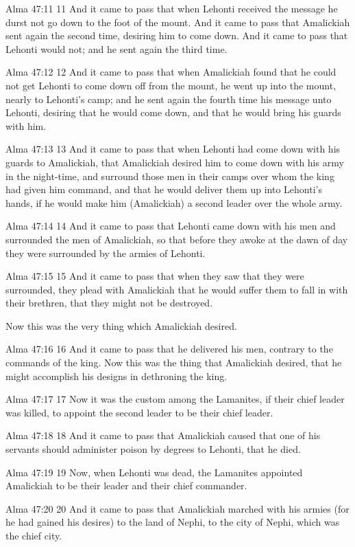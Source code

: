 Alma 47:11
 11 And it came to pass that when Lehonti received the message he
durst not go down to the foot of the mount. And it came to pass
that Amalickiah sent again the second time, desiring him to come
down. And it came to pass that Lehonti would not; and he sent
again the third time.

Alma 47:12
 12 And it came to pass that when Amalickiah found that he could
not get Lehonti to come down off from the mount, he went up into
the mount, nearly to Lehonti's camp; and he sent again the fourth
time his message unto Lehonti, desiring that he would come down,
and that he would bring his guards with him.

Alma 47:13
 13 And it came to pass that when Lehonti had come down with his
guards to Amalickiah, that Amalickiah desired him to come down
with his army in the night-time, and surround those men in their
camps over whom the king had given him command, and that he would
deliver them up into Lehonti's hands, if he would make him
(Amalickiah) a second leader over the whole army.

Alma 47:14
 14 And it came to pass that Lehonti came down with his men and
surrounded the men of Amalickiah, so that before they awoke at
the dawn of day they were surrounded by the armies of Lehonti.

Alma 47:15
 15 And it came to pass that when they saw that they were
surrounded, they plead with Amalickiah that he would suffer them
to fall in with their brethren, that they might not be destroyed.

Now this was the very thing which Amalickiah desired.

Alma 47:16
 16 And it came to pass that he delivered his men, contrary to
the commands of the king. Now this was the thing that Amalickiah
desired, that he might accomplish his designs in dethroning the
king.

Alma 47:17
 17 Now it was the custom among the Lamanites, if their chief
leader was killed, to appoint the second leader to be their chief
leader.

Alma 47:18
 18 And it came to pass that Amalickiah caused that one of his
servants should administer poison by degrees to Lehonti, that he
died.

Alma 47:19
 19 Now, when Lehonti was dead, the Lamanites appointed
Amalickiah to be their leader and their chief commander.

Alma 47:20
 20 And it came to pass that Amalickiah marched with his armies
(for he had gained his desires) to the land of Nephi, to the city
of Nephi, which was the chief city.

